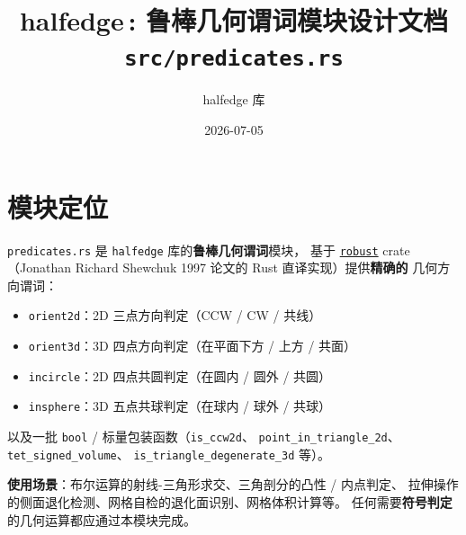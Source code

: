 \documentclass[11pt,a4paper]{article}
\title{\textbf{halfedge\,: 鲁棒几何谓词模块设计文档} \\ \large \texttt{src/predicates.rs}}
\author{halfedge 库}
\date{2026-07-05}
\begin{document}
\maketitle
\tableofcontents

\section{模块定位}

\texttt{predicates.rs} 是 \texttt{halfedge} 库的\textbf{鲁棒几何谓词}模块，
基于 \href{https://docs.rs/robust}{\texttt{robust}} crate
（Jonathan Richard Shewchuk 1997 论文的 Rust 直译实现）提供\textbf{精确的}
几何方向谓词：

\begin{itemize}
  \item \texttt{orient2d}：2D 三点方向判定（CCW / CW / 共线）
  \item \texttt{orient3d}：3D 四点方向判定（在平面下方 / 上方 / 共面）
  \item \texttt{incircle}：2D 四点共圆判定（在圆内 / 圆外 / 共圆）
  \item \texttt{insphere}：3D 五点共球判定（在球内 / 球外 / 共球）
\end{itemize}

以及一批 \texttt{bool} / 标量包装函数（\texttt{is\_ccw2d}、
\texttt{point\_in\_triangle\_2d}、\texttt{tet\_signed\_volume}、
\texttt{is\_triangle\_degenerate\_3d} 等）。

\textbf{使用场景}：布尔运算的射线-三角形求交、三角剖分的凸性 / 内点判定、
拉伸操作的侧面退化检测、网格自检的退化面识别、网格体积计算等。
任何需要\textbf{符号判定}的几何运算都应通过本模块完成。
\end{document}
